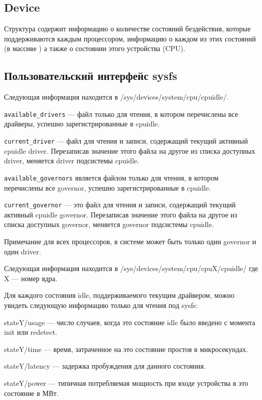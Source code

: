 \documentclass{article}
\begin{document}
\subsection{Device}
Структура содержит информацию о количестве состояний бездействия, которые поддерживаются каждым процессором, информацию о каждом из этих состояний (в массиве ) а также о состоянии этого устройства (CPU).


\subsection{Пользовательский интерфейс sysfs}

Следующая информация находится в /sys/devices/system/cpu/cpuidle/.

\texttt{available\_drivers} — файл только для чтения, в котором перечислены все драйверы, успешно зарегистрированные в cpuidle.

\texttt{current\_driver} — файл для чтения и записи, содержащий текущий активный cpuidle driver. Перезаписав значение этого файла на другое из списка доступных driver, меняется driver подсистемы cpuidle.

\texttt{available\_governors} является файлом только для чтения, в котором перечислены все governor, успешно зарегистрированные в cpuidle.

\texttt{current\_governor} — это файл для чтения и записи, содержащий текущий активный cpuidle governor. Перезаписав значение этого файла на другое из списка доступных governor, меняется governor подсистемы cpuidle.

Примечание для всех процессоров, в системе может быть только один governor и один driver.

Следующая информация находится в /sys/devices/system/cpu/cpuX/cpuidle/ где X --- номер ядра.

Для каждого состояния idle, поддерживаемого текущим драйвером, можно увидеть следующую информацию только для чтения под sysfs:

stateY/usage --- число случаев, когда это состояние idle было введено с момента init или redetect.

stateY/time --- время, затраченное на это состояние простоя в микросекундах. 

stateY/latency --- задержка пробуждения для данного состояния.

stateY/power --- типичная потребляемая мощность при входе устройства в это состояние в МВт.
\end{document}

